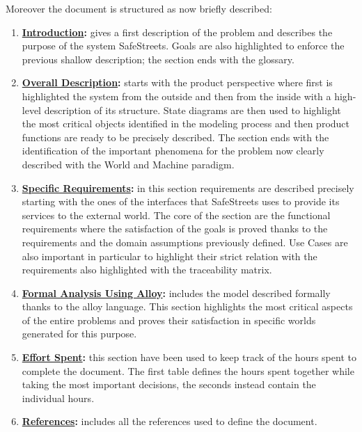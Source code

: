 	Moreover the document is structured as now briefly described:
	\begin{enumerate}
		\item \textbf{\hyperref[sec:introduction]{Introduction}:} gives a first description of the problem and describes the purpose of the system SafeStreets. Goals are also highlighted to enforce the previous shallow description; the section ends with the glossary.
		
		\item \textbf{\hyperref[sec:overallDescription]{Overall Description}:} starts with the product perspective where first is highlighted the system from the outside and then from the inside with a high-level description of its structure. State diagrams are then used to highlight the most critical objects identified in the modeling process and then product functions are ready to be precisely described. The section ends with the identification of the important phenomena for the problem now clearly described with the World and Machine paradigm.
		
		\item \textbf{\hyperref[sec:specificRequirements]{Specific Requirements}:} in this section requirements are described precisely starting with the ones of the interfaces that SafeStreets uses to provide its services to the external world. The core of the section are the functional requirements where the satisfaction of the goals is proved thanks to the requirements and the domain assumptions previously defined. Use Cases are also important in particular to highlight their strict relation with the requirements also highlighted with the traceability matrix.
		
		\item \textbf{\hyperref[sec:formalAnalysisUsingAlloy]{Formal Analysis Using Alloy}:} includes the model described formally thanks to the alloy language. This section highlights the most critical aspects of the entire problems and proves their satisfaction in specific worlds generated for this purpose.
		
		\item \textbf{\hyperref[sec:effortSpent]{Effort Spent}:} this section have been used to keep track of the hours spent to complete the document. The first table defines the hours spent together while taking the most important decisions, the seconds instead contain the individual hours.
		
		\item \textbf{\hyperref[sec:references]{References}:} includes all the references used to define the document.
	\end{enumerate}

